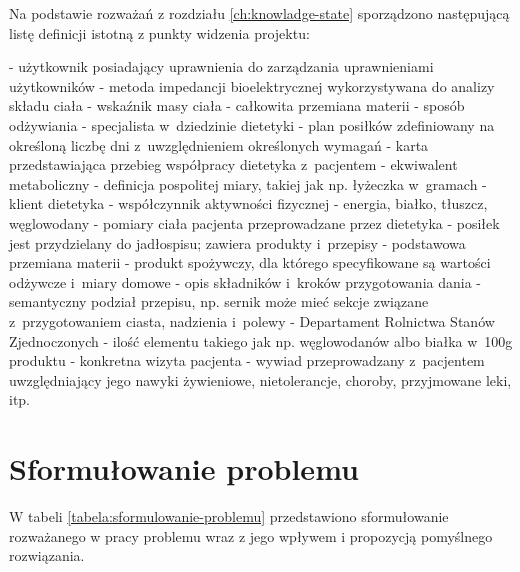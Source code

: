 Na podstawie rozważań z rozdziału \ref{ch:knowladge-state} sporządzono następującą listę definicji istotną z punkty widzenia projektu:
\begin{itemize}[series=atr, wide, align=left, leftmargin=190pt]
    - użytkownik posiadający uprawnienia do zarządzania uprawnieniami użytkowników
    - metoda impedancji bioelektrycznej wykorzystywana do analizy składu ciała%
    - wskaźnik masy ciała%
    - całkowita przemiana materii %
    - sposób odżywiania%
    - specjalista w~dziedzinie dietetyki
    - plan posiłków zdefiniowany na określoną liczbę dni z~uwzględnieniem określonych wymagań
    - karta przedstawiająca przebieg współpracy dietetyka z~pacjentem
    - ekwiwalent metaboliczny %
    - definicja pospolitej miary, takiej jak np. łyżeczka w~gramach
    - klient dietetyka
    - współczynnik aktywności fizycznej
    - energia, białko, tłuszcz, węglowodany%
    - pomiary ciała pacjenta przeprowadzane przez dietetyka
    - posiłek jest przydzielany do jadłospisu; zawiera produkty i~przepisy
    - podstawowa przemiana materii %
    - produkt spożywczy, dla którego specyfikowane są wartości odżywcze i~miary domowe
    - opis składników i~kroków przygotowania dania
    - semantyczny podział przepisu, np. sernik może mieć sekcje związane z~przygotowaniem ciasta, nadzienia i~polewy
    - Departament Rolnictwa Stanów Zjednoczonych%
    - ilość elementu takiego jak np. węglowodanów albo białka w~100g produktu
    - konkretna wizyta pacjenta
    - wywiad przeprowadzany z~pacjentem uwzględniający jego nawyki żywieniowe, nietolerancje, choroby, przyjmowane leki, itp.
\end{itemize}

\section{Sformułowanie problemu}\label{sec:problem-specification}

\par
W tabeli \ref{tabela:sformulowanie-problemu} przedstawiono sformułowanie rozważanego w pracy problemu wraz z jego wpływem i propozycją pomyślnego rozwiązania.

